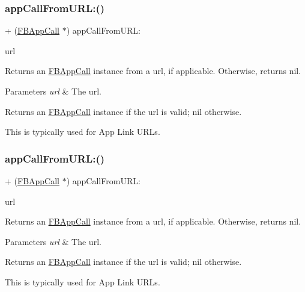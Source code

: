 \subsubsection{\texorpdfstring{app\+Call\+From\+U\+R\+L\+:()}{appCallFromURL:()}\hspace{0.1cm}{\footnotesize\ttfamily [1/5]}}
{\footnotesize\ttfamily + (\hyperlink{interfaceFBAppCall}{F\+B\+App\+Call} $\ast$) app\+Call\+From\+U\+R\+L\+: \begin{DoxyParamCaption}\item[{(N\+S\+U\+RL $\ast$)}]{url }\end{DoxyParamCaption}}

Returns an \hyperlink{interfaceFBAppCall}{F\+B\+App\+Call} instance from a url, if applicable. Otherwise, returns nil.


\begin{DoxyParams}{Parameters}
{\em url} & The url.\\
\hline
\end{DoxyParams}
\begin{DoxyReturn}{Returns}
an \hyperlink{interfaceFBAppCall}{F\+B\+App\+Call} instance if the url is valid; nil otherwise.
\end{DoxyReturn}
This is typically used for App Link U\+R\+Ls. \mbox{\label{interfaceFBAppCall_a03baee771317510fb167dad8926bc176}} 
\subsubsection{\texorpdfstring{app\+Call\+From\+U\+R\+L\+:()}{appCallFromURL:()}\hspace{0.1cm}{\footnotesize\ttfamily [2/5]}}
{\footnotesize\ttfamily + (\hyperlink{interfaceFBAppCall}{F\+B\+App\+Call} $\ast$) app\+Call\+From\+U\+R\+L\+: \begin{DoxyParamCaption}\item[{(N\+S\+U\+RL $\ast$)}]{url }\end{DoxyParamCaption}}

Returns an \hyperlink{interfaceFBAppCall}{F\+B\+App\+Call} instance from a url, if applicable. Otherwise, returns nil.


\begin{DoxyParams}{Parameters}
{\em url} & The url.\\
\hline
\end{DoxyParams}
\begin{DoxyReturn}{Returns}
an \hyperlink{interfaceFBAppCall}{F\+B\+App\+Call} instance if the url is valid; nil otherwise.
\end{DoxyReturn}
This is typically used for App Link U\+R\+Ls. \mbox{\label{interfaceFBAppCall_a03baee771317510fb167dad8926bc176}} 
